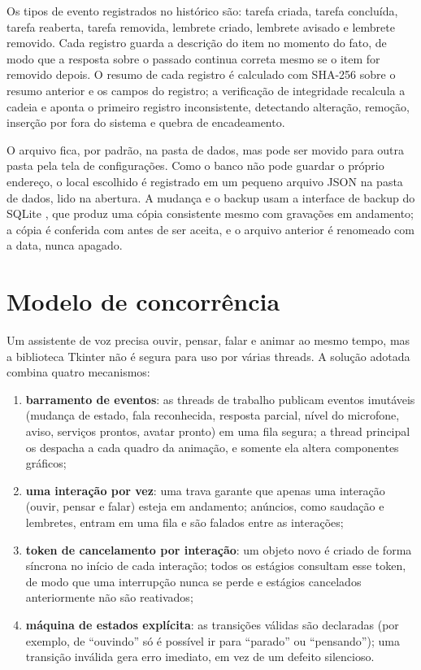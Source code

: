 Os tipos de evento registrados no histórico são: tarefa criada, tarefa concluída, tarefa reaberta,
tarefa removida, lembrete criado, lembrete avisado e lembrete removido. Cada registro guarda a
descrição do item no momento do fato, de modo que a resposta sobre o passado continua correta mesmo
se o item for removido depois. O resumo de cada registro é calculado com SHA-256 \cite{nist2015} sobre
o resumo anterior e os campos do registro; a verificação de integridade recalcula a cadeia e aponta o
primeiro registro inconsistente, detectando alteração, remoção, inserção por fora do sistema e
quebra de encadeamento.

O arquivo fica, por padrão, na pasta de dados, mas pode ser movido para outra pasta pela tela de
configurações. Como o banco não pode guardar o próprio endereço, o local escolhido é registrado em um
pequeno arquivo JSON na pasta de dados, lido na abertura. A mudança e o backup usam a interface de
backup do SQLite \cite{sqlite}, que produz uma cópia consistente mesmo com gravações em andamento; a
cópia é conferida com  antes de ser aceita, e o arquivo anterior é
renomeado com a data, nunca apagado.

\section{Modelo de concorrência}

Um assistente de voz precisa ouvir, pensar, falar e animar ao mesmo tempo, mas a biblioteca Tkinter
não é segura para uso por várias threads. A solução adotada combina quatro mecanismos:

\begin{enumerate}[label=\alph*)]
  \item \textbf{barramento de eventos}: as threads de trabalho publicam eventos imutáveis (mudança de
        estado, fala reconhecida, resposta parcial, nível do microfone, aviso, serviços prontos, avatar
        pronto) em uma fila segura; a thread principal os despacha a cada quadro da animação, e somente
        ela altera componentes gráficos;
  \item \textbf{uma interação por vez}: uma trava garante que apenas uma interação (ouvir, pensar e
        falar) esteja em andamento; anúncios, como saudação e lembretes, entram em uma fila e são falados
        entre as interações;
  \item \textbf{token de cancelamento por interação}: um objeto  novo é criado de
        forma síncrona no início de cada interação; todos os estágios consultam esse token, de modo que
        uma interrupção nunca se perde e estágios cancelados anteriormente não são reativados;
  \item \textbf{máquina de estados explícita}: as transições válidas são declaradas (por exemplo, de
        “ouvindo” só é possível ir para “parado” ou “pensando”); uma transição inválida gera erro
        imediato, em vez de um defeito silencioso.
\end{enumerate}

